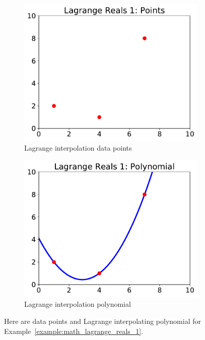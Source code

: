 \begin{figure}[t]
\centering
    \begin{subfigure}[t]{0.45\textwidth}
    \includegraphics[width=\textwidth]{plots/lagrange/lagrange_reals_points_1.pdf}
    \caption{Lagrange interpolation data points}
    \label{fig:lagrange_points_1}
    \end{subfigure}
    \begin{subfigure}[t]{0.45\textwidth}
    \includegraphics[width=\textwidth]{plots/lagrange/lagrange_reals_poly_1.pdf}
    \caption{Lagrange interpolation polynomial}
    \label{fig:lagrange_poly_1}
    \end{subfigure}
    \caption[Data points and Lagrange Interpolation over the reals 1]{Here
        are data points and Lagrange interpolating polynomial
        for Example~\ref{example:math_lagrange_reals_1}.}
\end{figure}

